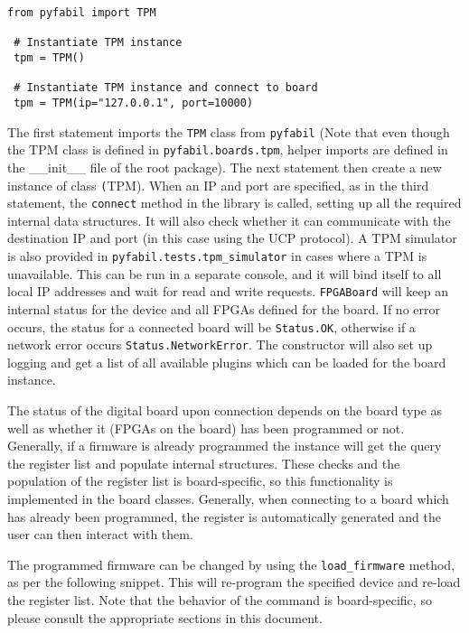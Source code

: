 \documentclass[a4paper,11pt]{article}
\begin{document}
\begin{lstlisting}[belowskip=-1 \baselineskip]
 from pyfabil import TPM
 
 # Instantiate TPM instance
 tpm = TPM()
 
 # Instantiate TPM instance and connect to board
 tpm = TPM(ip="127.0.0.1", port=10000)
\end{lstlisting}

The first statement imports the \texttt{TPM} class from \texttt{pyfabil} (Note 
that even though the TPM class is defined in \texttt{pyfabil.boards.tpm}, 
helper imports are defined in the \_\_init\_\_ file of the root package). The 
next statement then create a new instance of class \texttt(TPM). When an IP and 
port are specified, as in the third statement, the \texttt{connect} method in 
the library is called, setting up all the required internal data structures. It 
will also check whether it can communicate with the destination IP and port (in 
this case using the UCP protocol). A TPM simulator is also provided in 
\texttt{pyfabil.tests.tpm\_simulator} in cases where a TPM is unavailable. This 
can be run in a separate console, and it will bind itself to all local IP 
addresses and wait for read and write requests. \texttt{FPGABoard} will keep 
an internal status for the device and all FPGAs defined for the board. If no 
error occurs, the status for a connected board will be \texttt{Status.OK}, 
otherwise if a network error occurs \texttt{Status.NetworkError}. The 
constructor will also set up logging and get a list of all available plugins 
which can be loaded for the board instance. 

The status of the digital board upon connection depends on the board type as 
well as whether it (FPGAs on the board) has been programmed or not. Generally, 
if a firmware is already programmed the instance will get the query the 
register list and populate internal structures. These checks and the population 
of the register list is board-specific, so this functionality is implemented in 
the board classes. Generally, when connecting to a board which has already been 
programmed, the register is automatically generated and the user can then 
interact with them.

The programmed firmware can be changed by using the \texttt{load\_firmware} 
method, as per the following snippet. This will re-program the specified device 
and re-load the register list. Note that the behavior of the command is 
board-specific, so please consult the appropriate sections in this document.
\end{document}
